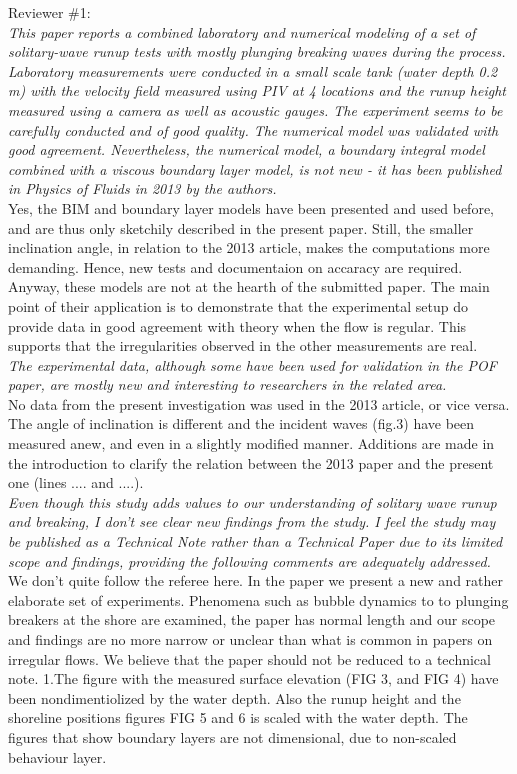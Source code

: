 \newcommand{\refpoint}[1]{\ \vspace{0.3cm}\\ {\em #1}\  \vspace{0.3cm}\\ }Reviewer \#1:
\refpoint{This paper reports a combined laboratory and numerical modeling of a set of solitary-wave runup tests 
with mostly plunging breaking waves during the process.  Laboratory measurements were conducted in a small scale tank 
(water depth 0.2 m) with the velocity field measured using PIV at 4 locations and the runup height measured using a 
camera as well as acoustic gauges.  The experiment seems to be carefully conducted and of good quality.  The numerical
 model was validated with good agreement.  Nevertheless, the numerical model, a boundary integral model combined with a
 viscous boundary layer model, is not new - it has been published in Physics of Fluids in 2013 by the authors.}
Yes, the BIM and boundary layer models have been presented and used before, and are thus only sketchily described 
in the present paper. Still, the smaller inclination angle, in relation to the 2013 article, makes the 
computations more demanding. Hence, new tests and documentaion on accaracy are required.\\
Anyway, these models are not at the hearth of the submitted paper.
The main point of their application  is to demonstrate that the experimental setup do
provide data in good agreement with theory when the flow is regular. This supports that the irregularities
observed in the other measurements are real.   
 \refpoint{The 
experimental data, although some have been used for validation in the POF paper, are mostly new and interesting to 
researchers in the related area.}
No data from the present investigation was used in the 2013 article, or vice versa. The angle of inclination
is different and the incident waves (fig.3) have been measured anew, and even in a slightly modified manner. 
Additions are made in the introduction to clarify the relation between the 2013 paper and the present one
(lines ....  and ....).
\refpoint{ Even though this study adds values to our understanding of solitary wave runup and 
breaking, I don't see clear new findings from the study.
 I feel the study may be published as a Technical Note rather than a Technical Paper due to its limited scope and 
findings, providing the following comments are adequately addressed.}
We don't quite follow the referee here. In the paper we present a new and rather elaborate set of experiments.
Phenomena such as bubble dynamics to to plunging breakers at the shore are examined, 
the paper has normal length and our scope and findings are no more narrow or unclear than what is common in 
papers on irregular flows.
We believe that the paper should not be reduced to a technical note. 
1.The figure with the measured surface elevation (FIG 3, and  FIG 4) have been  nondimentiolized  by the water depth. Also the runup height and the shoreline positions figures FIG 5 and 6 is scaled with the water depth. The figures that show boundary layers are not dimensional, due to non-scaled behaviour layer. 


